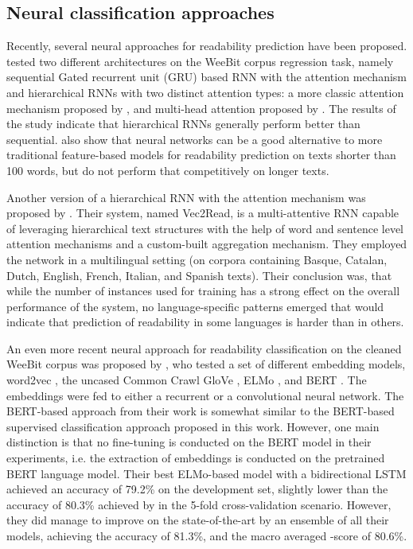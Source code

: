 \documentclass{clv3}
\begin{document}
\subsection{Neural classification approaches}
\label{sec:neural-classification}



Recently, several neural approaches for readability prediction have been proposed. \citet{nadeem2018estimating} tested two different architectures on the WeeBit corpus regression task, namely sequential Gated recurrent unit (GRU) \citep{cho2014learning} based RNN with the attention mechanism and hierarchical RNNs \citep{yang2016hierarchical} with two distinct attention types: a more classic attention mechanism proposed by \citet{bahdanau2014neural}, and multi-head attention proposed by \citet{vaswani2017attention}. The results of the study indicate that hierarchical RNNs generally perform better than sequential. \citet{nadeem2018estimating} also show that neural networks can be a good alternative to more traditional feature-based models for readability prediction on texts shorter than 100 words, but do not perform that competitively on longer texts.

Another version of a hierarchical RNN with the attention mechanism was proposed by \citet{azpiazu-pera-2019-multiattentive}. Their system, named Vec2Read, is a multi-attentive RNN capable of leveraging hierarchical text structures with the help of word and sentence level attention mechanisms and a custom-built aggregation mechanism. They employed the network in a multilingual setting (on corpora containing Basque, Catalan, Dutch, English, French, Italian, and Spanish texts). Their conclusion was, that while the number of instances used for training has a strong effect on the overall performance of the system, no language-specific patterns emerged that would indicate that prediction of readability in some languages is harder than in others.

An even more recent neural approach for readability classification on the cleaned WeeBit corpus \citep{xia2016text} was proposed by \citet{filighera2019automatic}, who tested a set of different embedding models, word2vec \citep{mikolov2013distributed}, the uncased Common Crawl GloVe \citep{pennington2014glove}, ELMo \citep{peters2018deep}, and BERT \citep{devlin2018bert}. The embeddings were fed to either a recurrent or a convolutional neural network. The BERT-based approach from their work is somewhat similar to the BERT-based supervised classification approach proposed in this work. However, one main distinction is that no fine-tuning is conducted on the BERT model in their experiments, i.e. the extraction of embeddings is conducted on the pretrained BERT language model. Their best ELMo-based model with a bidirectional LSTM achieved an accuracy of 79.2\% on the development set, slightly lower than the accuracy of 80.3\% achieved by \citet{xia2016text} in the 5-fold cross-validation scenario. However, they did manage to improve on the state-of-the-art by an ensemble of all their models, achieving the accuracy of 81.3\%, and the macro averaged -score of 80.6\%.
\end{document}
